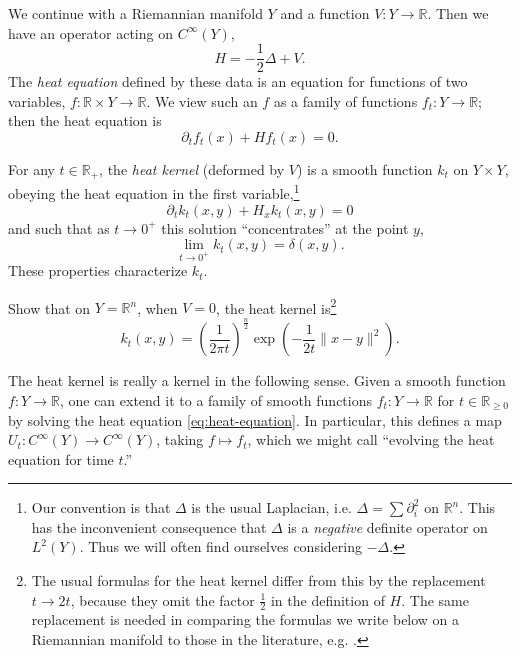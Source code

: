 \documentclass[12pt,letterpaper,reqno]{article}
\numberwithin{equation}{section}
\newcommand{\R}{\ensuremath{\mathbb R}}
\newcommand{\half}{\ensuremath{\frac{1}{2}}}
\newcommand{\norm}[1]{\lVert#1\rVert}
\newcommand{\ti}[1]{\textit{#1}}
\newcommand{\fixme}[1]{{\color{orange}{[#1]}}}
\begin{document}
We continue with a Riemannian manifold $Y$ and a function $V: Y \to \R$.
Then we have an operator acting on $C^\infty(Y)$,
\begin{equation}
  H = - \half \Delta + V.
\end{equation}
The \ti{heat equation} defined by these data is an equation
for functions of two variables, $f: \R \times Y \to \R$.
We view such an $f$ as a family of functions $f_t: Y \to \R$;
then the heat equation is
\begin{equation} \label{eq:heat-equation}
  \partial_t f_t(x) + H f_t(x) = 0. 
\end{equation}

\begin{prop} \fixme{what class of $Y$, $V$?}
For any $t \in \R_+$, the \ti{heat kernel} (deformed by $V$) 
is a smooth function $k_t$ on $Y \times Y$, obeying the heat
equation in the first variable,\footnote{Our
convention is that $\Delta$ is the usual Laplacian,
i.e. $\Delta = \sum \partial_i^2$ on $\R^n$. This has the inconvenient
consequence that $\Delta$ is a \ti{negative} definite operator on $L^2(Y)$.
Thus we will often find ourselves considering $- \Delta$.}
\begin{equation}
  \partial_t k_t(x,y) + H_x k_t(x,y) = 0
\end{equation}
and such that as $t \to 0^+$ this solution ``concentrates'' at the point $y$,
\begin{equation}
  \lim_{t \to 0^+} k_t(x,y) = \delta(x,y). 
\end{equation}
These properties characterize $k_t$.
\end{prop}
\begin{exercise}
Show that on $Y = \R^n$, when $V = 0$, the heat kernel
is\footnote{The usual formulas for the heat kernel differ from this by the
replacement $t \to 2t$, because they omit the factor $\half$ in the
definition of $H$. The same replacement is needed in comparing the formulas we write below
on a Riemannian manifold to those in the literature, e.g. \cite{Roe1988a}.}
\begin{equation}
  k_t(x,y) = \left( \frac{1}{2 \pi t} \right)^{\frac{n}{2}} \exp \left( - \frac{1}{2t} \norm{x-y}^2 \right).
\end{equation}
\end{exercise}

The heat kernel is really a kernel in the following sense.
Given a smooth function $f: Y \to \R$, one can extend it to a family of smooth 
functions $f_t: Y \to \R$ for $t \in \R_{\ge 0}$ by solving the heat equation
\eqref{eq:heat-equation}.
In particular, this defines a map $U_t: C^\infty(Y) \to C^\infty(Y)$,
taking $f \mapsto f_t$, which we might call
``evolving the heat equation for time $t$.''
\end{document}
